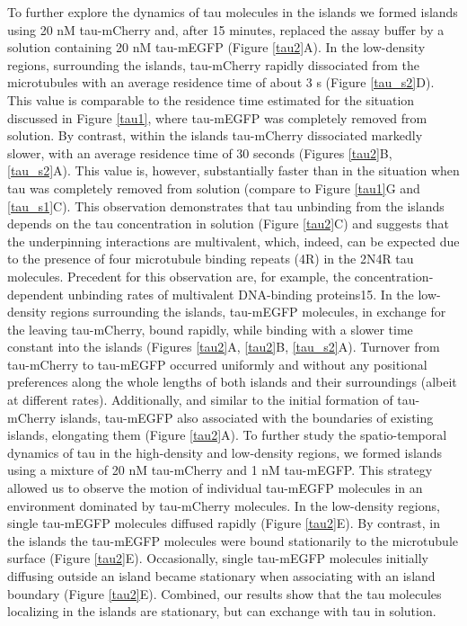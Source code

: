 To further explore the dynamics of tau molecules in the islands we formed islands using 20 nM tau-mCherry and, after 15 minutes, replaced the assay buffer by a solution containing 20 nM tau-mEGFP (Figure \ref{tau2}A). In the low-density regions, surrounding the islands, tau-mCherry rapidly dissociated from the microtubules with an average residence time of about 3 s (Figure \ref{tau_s2}D). This value is comparable to the residence time estimated for the situation discussed in Figure \ref{tau1}, where tau-mEGFP was completely removed from solution. By contrast, within the islands tau-mCherry dissociated markedly slower, with an average residence time of 30 seconds (Figures \ref{tau2}B, \ref{tau_s2}A). This value is, however, substantially faster than in the situation when tau was completely removed from solution (compare to Figure \ref{tau1}G and \ref{tau_s1}C). This observation demonstrates that tau unbinding from the islands depends on the tau concentration in solution (Figure \ref{tau2}C) and suggests that the underpinning interactions are multivalent, which, indeed, can be expected due to the presence of four microtubule binding repeats (4R) in the 2N4R tau molecules. Precedent for this observation are, for example, the concentration-dependent unbinding rates of multivalent DNA-binding proteins15. In the low-density regions surrounding the islands, tau-mEGFP molecules, in exchange for the leaving tau-mCherry, bound rapidly, while binding with a slower time constant into the islands (Figures \ref{tau2}A, \ref{tau2}B, \ref{tau_s2}A). Turnover from tau-mCherry to tau-mEGFP occurred uniformly and without any positional preferences along the whole lengths of both islands and their surroundings (albeit at different rates). Additionally, and similar to the initial formation of tau-mCherry islands, tau-mEGFP also associated with the boundaries of existing islands, elongating them (Figure \ref{tau2}A). To further study the spatio-temporal dynamics of tau in the high-density and low-density regions, we formed islands using a mixture of 20 nM tau-mCherry and 1 nM tau-mEGFP. This strategy allowed us to observe the motion of individual tau-mEGFP molecules in an environment dominated by tau-mCherry molecules. In the low-density regions, single tau-mEGFP molecules diffused rapidly (Figure \ref{tau2}E). By contrast, in the islands the tau-mEGFP molecules were bound stationarily to the microtubule surface (Figure \ref{tau2}E). Occasionally, single tau-mEGFP molecules initially diffusing outside an island became stationary when associating with an island boundary (Figure \ref{tau2}E). Combined, our results show that the tau molecules localizing in the islands are stationary, but can exchange with tau in solution.

